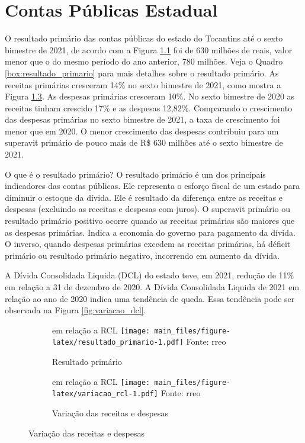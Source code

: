 \documentclass[twocolumn, a4paper, 10pt]{report}
\newcommand{\source}[1]{\scriptsize{Fonte: #1}\\}
\newcommand{\subcap}[1]{{\scriptsize\color{primarycolor}#1\newline}}
\begin{document}
    
    \hypertarget{contas-puxfablicas-estadual}{%
    \chapter{Contas Públicas
    Estadual}\label{contas-puxfablicas-estadual}}

    O resultado primário das contas públicas do estado do Tocantins até
    o sexto bimestre de 2021, de acordo com a Figura
    \ref{fig:resultado_primario} foi de 630 milhões de reais, valor
    menor que o do mesmo período do ano anterior, 780 milhões. Veja o
    Quadro \ref{box:resultado_primario} para mais detalhes sobre o
    resultado primário. As receitas primárias cresceram 14\% no sexto
    bimestre de 2021, como mostra a Figura \ref{fig:variacao_rcl}. As
    despesas primárias cresceram 10\%. No sexto bimestre de 2020 as
    receitas tinham crescido 17\% e as despesas 12,82\%. Comparando o
    crescimento das despesas primárias no sexto bimestre de 2021, a taxa
    de crescimento foi menor que em 2020. O menor crescimento das
    despesas contribuiu para um superavit primário de pouco mais de R\$
    630 milhões até o sexto bimestre de 2021.

    \begin{smbox}[label={box:resultado_primario}]{O que é o resultado primário?}
    O resultado primário é um dos principais indicadores das contas
    públicas. Ele representa o esforço fiscal de um estado para diminuir
    o estoque da dívida. Ele é resultado da diferença entre as receitas
    e despesas (excluindo as receitas e despesas com juros). O superavit
    primário ou resultado primário positivo ocorre quando as receitas
    primárias são maiores que as despesas primárias. Indica a economia
    do governo para pagamento da dívida. O inverso, quando despesas
    primárias excedem as receitas primárias, há déficit primário ou
    resultado primário negativo, incorrendo em aumento da dívida.

    \end{smbox}

    A Dívida Consolidada Liquida (DCL) do estado teve, em 2021, redução
    de 11\% em relação a 31 de dezembro de 2020. A Dívida Consolidada
    Liquida de 2021 em relação ao ano de 2020 indica uma tendência de
    queda. Essa tendência pode ser observada na Figura
    \ref{fig:variacao_dcl}.

    \begin{figure}[!h]
    \begin{subfigure}{\linewidth}
    \caption{Resultado primário\label{fig:resultado_primario}}
    \subcap{em relação a RCL}
    \texttt{[image: main\_files/figure-latex/resultado\_primario-1.pdf]}
    \source{\acrshort{rreo}}
    \end{subfigure}

    \begin{subfigure}{\linewidth}
    \caption{Variação das receitas e despesas\label{fig:variacao_rcl}}
    \subcap{em relação a RCL}
    \texttt{[image: main\_files/figure-latex/variacao\_rcl-1.pdf]}
    \source{\acrshort{rreo}}
    \end{subfigure}
    \end{figure}
\end{document}
